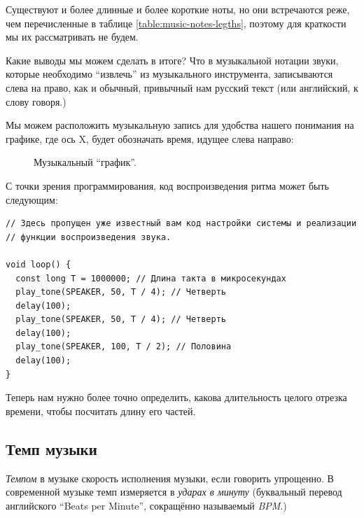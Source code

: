 \documentclass[a4paper,twoside]{book}
\begin{document}
Существуют и более длинные и более короткие ноты, но они встречаются реже, чем
перечисленные в таблице \ref{table:music-notes-legths}, поэтому для краткости мы
их рассматривать не будем.

Какие выводы мы можем сделать в итоге? Что в музыкальной нотации звуки, которые
необходимо ``извлечь'' из музыкального инструмента, записываются слева на право,
как и обычный, привычный нам русский текст (или английский, к слову говоря.)

Мы можем расположить музыкальную запись для удобства нашего понимания на
графике, где ось $\mbox{X}$, будет обозначать время, идущее слева направо:

\begin{figure}[ht]
  \caption{Музыкальный ``график''.}
  \centering

  \label{fig:lilypond-queen-1}
\end{figure}

С точки зрения программирования, код воспроизведения ритма может быть следующим:

\begin{verbatim}
// Здесь пропущен уже известный вам код настройки системы и реализации
// функции воспроизведения звука.

void loop() {
  const long T = 1000000; // Длина такта в микросекундах
  play_tone(SPEAKER, 50, T / 4); // Четверть
  delay(100);
  play_tone(SPEAKER, 50, T / 4); // Четверть
  delay(100);
  play_tone(SPEAKER, 100, T / 2); // Половина
  delay(100);
}
\end{verbatim}

Теперь нам нужно более точно определить, какова длительность целого отрезка
времени, чтобы посчитать длину его частей.

\subsection{Темп музыки}

\emph{Темпом} в музыке скорость исполнения музыки, если говорить упрощенно. В
современной музыке темп измеряется в \emph{ударах в минуту} (буквальный перевод
английского ``Beats per Minute'', сокращённо называемый \emph{\gls{BPM}}.)
\end{document}
